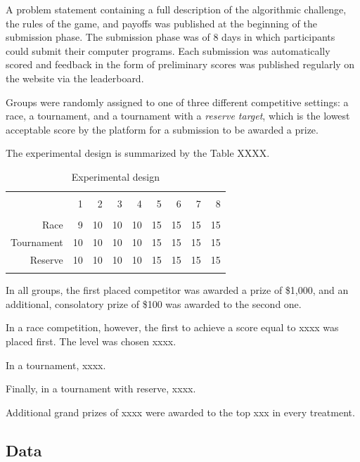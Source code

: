 \documentclass[12pt,]{article}
\theoremstyle{plain} %
\begin{document}
A problem statement containing a full description of the algorithmic
challenge, the rules of the game, and payoffs was published at the
beginning of the submission phase. The submission phase was of 8 days in
which participants could submit their computer programs. Each submission
was automatically scored and feedback in the form of preliminary scores
was published regularly on the website via the leaderboard.

Groups were randomly assigned to one of three different competitive
settings: a race, a tournament, and a tournament with a \emph{reserve
target}, which is the lowest acceptable score by the platform for a
submission to be awarded a prize.

The experimental design is summarized by the Table XXXX.

\begin{table}
\centering
\caption{Experimental design}
\label{experimental design}
\begin{tabular}{rrrrrrrrr}
  \\[-1.8ex]\hline\hline\\[-1.8ex]
 & 1 & 2 & 3 & 4 & 5 & 6 & 7 & 8 \\ 
  \hline\\[-1.86ex]
Race &   9 &  10 &  10 &  10 &  15 &  15 &  15 &  15 \\ 
  Tournament &  10 &  10 &  10 &  10 &  15 &  15 &  15 &  15 \\ 
  Reserve &  10 &  10 &  10 &  10 &  15 &  15 &  15 &  15 \\ 
   \hline\\[-1.8ex]
\end{tabular}
\end{table}

In all groups, the first placed competitor was awarded a prize of
\$1,000, and an additional, consolatory prize of \$100 was awarded to
the second one.

In a race competition, however, the first to achieve a score equal to
xxxx was placed first. The level was chosen xxxx.

In a tournament, xxxx.

Finally, in a tournament with reserve, xxxx.

Additional grand prizes of xxxx were awarded to the top xxx in every
treatment.

\subsection{Data}\label{data}
\end{document}

